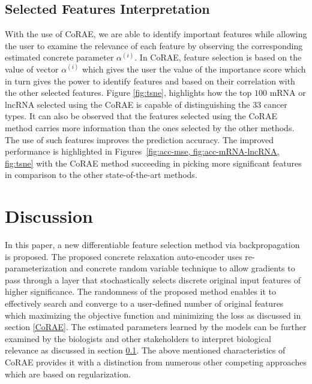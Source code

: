 \documentclass{bioinfo}
\begin{document}
\subsection{Selected Features Interpretation} \label{inter}
With the use of CoRAE, we are able to identify important features while allowing the user to examine the relevance of each feature by observing the corresponding estimated concrete parameter $\alpha^{(i)}$.
In CoRAE, feature selection is based on the value of vector $\alpha^{(i)}$ which gives the user the value of the importance score which in turn gives the power to identify features and based on their correlation with the other selected features. 
Figure \ref{fig:tsne}, highlights how the top $100$ mRNA or lncRNA selected using the CoRAE is capable of distinguishing the $33$ cancer types. 
It can also be observed that the  features selected using the CoRAE method carries more information than the ones selected by the other methods.
The use of such features improves the prediction accuracy.
The improved performance is highlighted in Figures~\ref{fig:acc-mse, fig:acc-mRNA-lncRNA, fig:tsne} with the CoRAE method succeeding in picking more significant features in comparison to the other state-of-the-art methods.



\section{Discussion}
In this paper, a new differentiable feature selection method via backpropagation is proposed.
The proposed concrete relaxation auto-encoder uses re-parameterization and concrete random variable technique to allow gradients to pass through a layer that stochastically selects discrete original input features of higher significance.
The randomness of the proposed method enables it to effectively search and converge to a user-defined number of original features which maximizing the objective function and minimizing the loss as discussed in section \ref{CoRAE}.
The estimated parameters learned by the models can be further examined by the biologists and other stakeholders to interpret biological relevance as discussed in section \ref{inter}.
The above mentioned characteristics of CoRAE provides it with a distinction from numerous other competing approaches which are based on regularization. 
\end{document}
